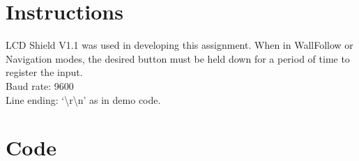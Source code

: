 \documentclass[]{article}
\begin{document}
	
	\section{Instructions}
		LCD Shield V1.1 was used in developing this assignment. When in WallFollow or Navigation modes, the desired button must be held down for a period of time to register the input.\\
		Baud rate: 9600\\
		Line ending: `\textbackslash r\textbackslash n' as in demo code.
	\section{Code}
	
\end{document}
